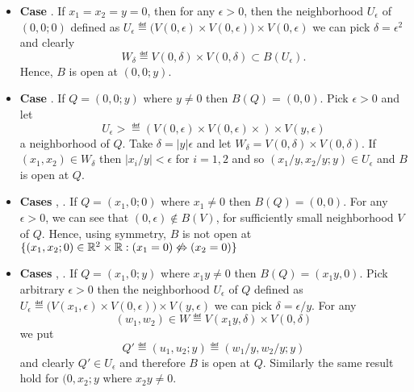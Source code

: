 \begin{enumerate}
\begin{itemize}
\item \textbf{Case} .
If \(x_1 = x_2 = y = 0\), then for any \(\epsilon>0\), 
then the neighborhood \(U_\epsilon\) of
\((0,0;0)\) defined as 
\(U_\epsilon 
  \eqdef \bigl(V(0,\epsilon) \times  V(0,\epsilon)\bigr) \times V(0,\epsilon)\)
we can pick \(\delta = \epsilon^2\) and clearly
\begin{equation*}
 W_\delta \eqdef V(0,\delta) \times V(0,\delta) \subset B(U_\epsilon).
\end{equation*}
Hence, $B$ is open at \((0,0;y)\).

\item \textbf{Case} .
If \(Q = (0,0;y)\) where \(y\neq 0\) then \(B(Q)=(0,0)\).
Pick \(\epsilon>0\) and let 
\begin{equation*}
U_\epsilon> \eqdef (V(0,\epsilon)\times V(0,\epsilon)\times)\times V(y,\epsilon)
\end{equation*}
a neighborhood of $Q$.
Take \(\delta = |y|\epsilon\) and let 
\(W_\delta = V(0,\delta)\times V(0,\delta)\).
If \((x_1,x_2)\in W_\delta\) then
\(|x_i/y| < \epsilon\) for \(i=1,2\) and 
so \((x_1/y,x_2/y;y)\in U_\epsilon\) and $B$ is open at $Q$.

\item \textbf{Cases} , .
If \(Q = (x_1,0;0)\) where \(x_1\neq 0\) then \(B(Q)=(0,0)\).
For any 
\(\epsilon > 0\), 
we can see that
\((0,\epsilon)\notin B(V)\), for sufficiently small neighborhood $V$ of $Q$.
Hence, using symmetry, $B$ is not open at
\(\{(x_1,x_2;0)\in \mathbb{R}^2\times\mathbb{R}: (x_1=0) \not\Leftrightarrow (x_2=0)\}\)


\item \textbf{Cases} , .
If \(Q = (x_1,0;y)\) where \(x_1y\neq 0\) then \(B(Q)=(x_1y,0)\).
Pick arbitrary \(\epsilon>0\) 
then the neighborhood \(U_\epsilon\) of $Q$ defined as 
\(U_\epsilon 
  \eqdef \bigl(V(x_1,\epsilon) \times  V(0,\epsilon)\bigr) \times V(y,\epsilon)\)
we can pick \(\delta = \epsilon/y\).
For any
\begin{equation*}
(w_1,w_2) \in W \eqdef V(x_1y, \delta) \times V(0,\delta)
\end{equation*}
we put 
\begin{equation*}
Q' \eqdef (u_1,u_2;y) \eqdef (w_1/y, w_2/y;y)
\end{equation*}
and clearly \(Q'\in U_\epsilon\) and therefore $B$ is open at $Q$.
Similarly the same result hold for \((0,x_2;y\) where \(x_2y\neq 0\).


\end{itemize}
\end{enumerate}
